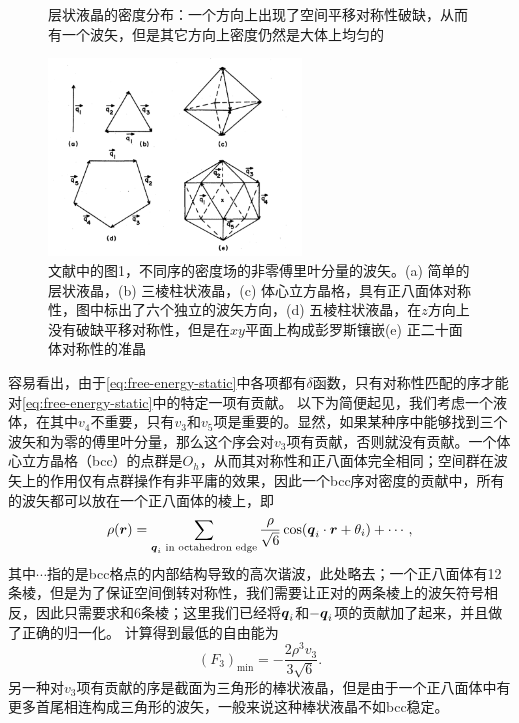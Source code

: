 \documentclass[hyperref, UTF8, a4paper]{ctexart}
\begin{document}
\begin{figure}
    \centering
    
    \caption{层状液晶的密度分布：一个方向上出现了空间平移对称性破缺，从而有一个波矢，但是其它方向上密度仍然是大体上均匀的}
    \label{fig:smectic}
\end{figure}

\begin{figure}
    \centering
    \includegraphics[width=0.6\textwidth]{wavevector.PNG}
    \caption{文献\cite{PhysRevB.32.5764}中的图1，不同序的密度场的非零傅里叶分量的波矢。(a) 简单的层状液晶，(b) 三棱柱状液晶，(c) 体心立方晶格，具有正八面体对称性，图中标出了六个独立的波矢方向，(d) 五棱柱状液晶，在$z$方向上没有破缺平移对称性，但是在$xy$平面上构成彭罗斯镶嵌(e) 正二十面体对称性的准晶}
    \label{fig:wavevectors}
\end{figure}

容易看出，由于\eqref{eq:free-energy-static}中各项都有$\delta$函数，只有对称性匹配的序才能对\eqref{eq:free-energy-static}中的特定一项有贡献。
以下为简便起见，我们考虑一个液体，在其中$v_4$不重要，只有$v_3$和$v_5$项是重要的。显然，如果某种序中能够找到三个波矢和为零的傅里叶分量，那么这个序会对$v_3$项有贡献，否则就没有贡献。一个体心立方晶格（bcc）的点群是$O_h$，从而其对称性和正八面体完全相同；空间群在波矢上的作用仅有点群操作有非平庸的效果，因此一个bcc序对密度的贡献中，所有的波矢都可以放在一个正八面体的棱上，即
\begin{equation}
    \rho(\vb*{r}) = \sum_\text{$\vb*{q}_i$ in octahedron edge} \frac{\rho}{\sqrt{6}} \cos(\vb*{q}_i \cdot \vb*{r} + \theta_i) + \cdots,
\end{equation}
其中$\cdots$指的是bcc格点的内部结构导致的高次谐波，此处略去；一个正八面体有12条棱，但是为了保证空间倒转对称性，我们需要让正对的两条棱上的波矢符号相反，因此只需要求和6条棱；这里我们已经将$\vb*{q}_i$和$-\vb*{q}_i$项的贡献加了起来，并且做了正确的归一化。
计算得到最低的自由能为
\begin{equation}
    (F_3)_\text{min} = - \frac{2 \rho^3 v_3}{3 \sqrt{6}}.
    \label{eq:bcc-free-energy}
\end{equation}
另一种对$v_3$项有贡献的序是截面为三角形的棒状液晶，但是由于一个正八面体中有更多首尾相连构成三角形的波矢，一般来说这种棒状液晶不如bcc稳定。
\end{document}

